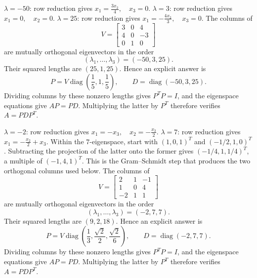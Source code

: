 $\lambda=-50$: row reduction gives \(x_{1}=\frac{3 x_{2}}{4},\quad x_{3}=0\).
$\lambda=3$: row reduction gives \(x_{1}=0,\quad x_{2}=0\).
$\lambda=25$: row reduction gives \(x_{1}=- \frac{4 x_{2}}{3},\quad x_{3}=0\).
The columns of
\[
 V=\begin{bmatrix}3&0&4\\4&0&-3\\0&1&0\end{bmatrix}
\]
are mutually orthogonal eigenvectors in the order
\[
 (\lambda_1,\ldots,\lambda_3)=(-50,3,25).
\]
Their squared lengths are $(25,1,25)$. Hence an explicit answer is
\[
 P=V\operatorname{diag}(\frac{1}{5},1,\frac{1}{5}),\qquad
 D=\operatorname{diag}(-50,3,25).
\]
Dividing columns by these nonzero lengths gives $P^TP=I$, and the
eigenspace equations give $AP=PD$. Multiplying the latter by $P^T$
therefore verifies $A=PDP^T$.

$\lambda=-2$: row reduction gives \(x_{1}=- x_{3},\quad x_{2}=- \frac{x_{3}}{2}\).
$\lambda=7$: row reduction gives \(x_{1}=- \frac{x_{2}}{2} + x_{3}\).
Within the $7$-eigenspace, start with $(1,0,1)^T$ and $(-1/2,1,0)^T$.
Subtracting the projection of the latter onto the former gives
$(-1/4,1,1/4)^T$, a multiple of $(-1,4,1)^T$. This is the Gram--Schmidt
step that produces the two orthogonal columns used below.
The columns of
\[
 V=\begin{bmatrix}2&1&-1\\1&0&4\\-2&1&1\end{bmatrix}
\]
are mutually orthogonal eigenvectors in the order
\[
 (\lambda_1,\ldots,\lambda_3)=(-2,7,7).
\]
Their squared lengths are $(9,2,18)$. Hence an explicit answer is
\[
 P=V\operatorname{diag}(\frac{1}{3},\frac{\sqrt{2}}{2},\frac{\sqrt{2}}{6}),\qquad
 D=\operatorname{diag}(-2,7,7).
\]
Dividing columns by these nonzero lengths gives $P^TP=I$, and the
eigenspace equations give $AP=PD$. Multiplying the latter by $P^T$
therefore verifies $A=PDP^T$.

